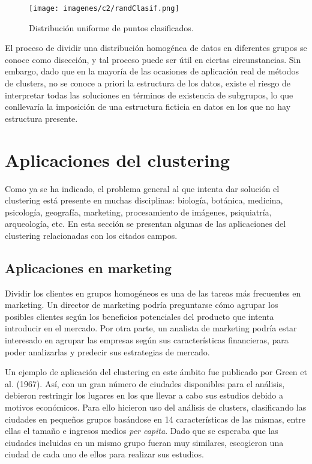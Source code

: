 \begin{figure}[!h]
	\centering
	\texttt{[image: imagenes/c2/randClasif.png]} 
	\caption{Distribución uniforme de puntos clasificados.}\label{fig:figure3}
\end{figure}

El proceso de dividir una distribución homogénea de datos en diferentes grupos se conoce como disección, y tal proceso puede ser útil en ciertas circunstancias. Sin embargo, dado que en la mayoría de las ocasiones de aplicación real de métodos de clusters, no se conoce a priori la estructura de los datos, existe el riesgo de interpretar todas las soluciones en términos de existencia de subgrupos, lo que conllevaría la imposición de una estructura ficticia en datos en los que no hay estructura presente.

\section{Aplicaciones del clustering}

Como ya se ha indicado, el problema general al que intenta dar solución el clustering está presente en muchas disciplinas: biología, botánica, medicina, psicología, geografía, marketing, procesamiento de imágenes, psiquiatría, arqueología, etc. En esta sección se presentan algunas de las aplicaciones del clustering relacionadas con los citados campos.

\subsection{Aplicaciones en marketing}

Dividir los clientes en grupos homogéneos es una de las tareas más frecuentes en marketing. Un director de marketing podría preguntarse cómo agrupar los posibles clientes según los beneficios potenciales del producto que intenta introducir en el mercado. Por otra parte, un analista de marketing podría estar interesado en agrupar las empresas según sus características financieras, para poder analizarlas y predecir sus estrategias de mercado.

Un ejemplo de aplicación del clustering en este ámbito fue publicado por Green et al. (1967). Así, con un gran número de ciudades disponibles para el análisis, debieron restringir los lugares en los que llevar a cabo sus estudios debido a motivos económicos. Para ello hicieron uso del análisis de clusters, clasificando las ciudades en pequeños grupos basándose en 14 características de las mismas, entre ellas el tamaño e ingresos medios \textit{per capita}. Dado que se esperaba que las ciudades incluidas en un mismo grupo fueran muy similares, escogieron una ciudad de cada uno de ellos para realizar sus estudios.

